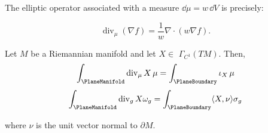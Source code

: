 The elliptic operator associated with a measure $\dd \mu = w\, \dd V$ is precisely:

$$
\operatorname{div}_\mu(\nabla f)=\frac{1}{w} \nabla \cdot(w \nabla f) .
$$
\fi 



\begin{theorem}
Let $M$ be a Riemannian manifold and let $X \in$ $\Gamma_{C^1}(T M)$. Then,
\begin{equation}
\int_{\PlaneManifold} \operatorname{div}_\mu X \, \mu = \int_{\PlaneBoundary} \iota_X \, \mu
\label{eq:gauss-div-thm}
\end{equation}
$$
\int_{\PlaneManifold} \operatorname{div}_g X \omega_g=\int_{\PlaneBoundary}\langle X, \nu\rangle \sigma_g
$$

where $\nu$ is the unit vector normal to $\partial M$.
\end{theorem}
